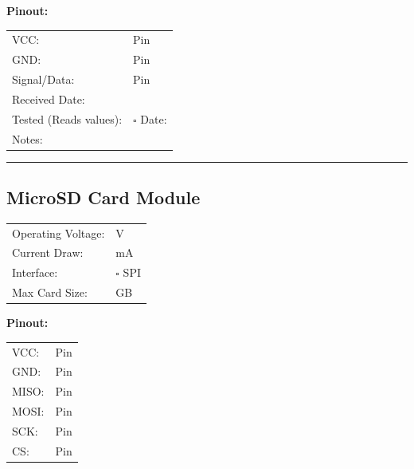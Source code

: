 \documentclass[10pt,letterpaper]{article}
\begin{document}
\textbf{Pinout:}
\begin{tabularx}{\textwidth}{lX}
VCC: & Pin \underline{\hspace{1cm}} \\
GND: & Pin \underline{\hspace{1cm}} \\
Signal/Data: & Pin \underline{\hspace{1cm}} \\[0.5em]
Received Date: & \underline{\hspace{4cm}} \\
Tested (Reads values): & $\square$ \quad Date: \underline{\hspace{3cm}} \\
Notes: & \underline{\hspace{10cm}} \\
\end{tabularx}

\vspace{0.5em}
\hrule
\vspace{0.5em}

\subsection*{MicroSD Card Module}
\begin{tabularx}{\textwidth}{lX}
Operating Voltage: & \underline{\hspace{4cm}} V \\
Current Draw: & \underline{\hspace{4cm}} mA \\
Interface: & $\square$ SPI \\
Max Card Size: & \underline{\hspace{4cm}} GB \\
\end{tabularx}

\textbf{Pinout:}
\begin{tabularx}{\textwidth}{lX}
VCC: & Pin \underline{\hspace{1cm}} \\
GND: & Pin \underline{\hspace{1cm}} \\
MISO: & Pin \underline{\hspace{1cm}} \\
MOSI: & Pin \underline{\hspace{1cm}} \\
SCK: & Pin \underline{\hspace{1cm}} \\
CS: & Pin \underline{\hspace{1cm}} \\
\end{tabularx}
\end{document}
